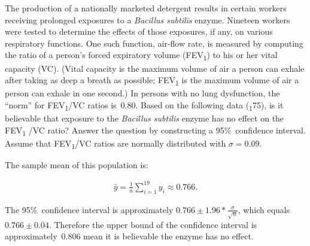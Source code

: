 \begin{problem}
   The production of a nationally marketed detergent results in certain workers receiving prolonged exposures to a \textit{Bacillus subtilis} enzyme. Nineteen workers were tested to determine the effects of those exposures, if any, on various respiratory functions. One such function, air-flow rate, is measured by computing the ratio of a person’s forced expiratory volume (FEV\textsubscript{1}) to his or her vital capacity (VC). (Vital capacity is the maximum volume of air a person can exhale after taking as deep a breath as possible; FEV\textsubscript{1} is the maximum volume of air a person can exhale in one second.) In persons with no lung dysfunction, the “norm” for FEV\textsubscript{1}/VC ratios is~0.80. Based on the following data (\textsubscript{1}75), is it believable that exposure to the \textit{Bacillus subtilis} enzyme has no effect on the FEV\textsubscript{1} /VC ratio? Answer the question by constructing a 95\%~confidence interval. Assume that FEV\textsubscript{1}/VC ratios are normally distributed with ${\sigma = 0.09}$.
\end{problem}

The sample mean of this population is:

\begin{align*}
  \bar{y} = \frac{1}{n} \sum_{i=1}^{19}y_i \approx 0.766 \text{.}
\end{align*}

The 95\%~confidence interval is approximately ${0.766 \pm 1.96 * \frac{\sigma}{\sqrt{n}}}$, which equals ${0.766 \pm 0.04}$.  Therefore the upper bound of the confidence interval is approximately~0.806 mean it is believable the enzyme has no effect.
